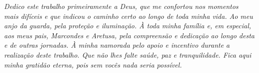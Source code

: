 \begin{titlepage}

\vspace*{\fill}

\hfill
\begin{minipage}{0.5\linewidth}
\begin{flushright}
\large\it
Dedico este trabalho primeiramente a Deus, que me confortou nos momentos mais
difíceis e que indicou o caminho certo ao longo de toda minha vida. Ao meu anjo
da guarda, pela proteção e iluminação. À toda minha família e, em especial, aos
meus pais, Marcondes e Aretusa, pela compreensão e dedicação ao longo desta e de
outras jornadas. À minha namorada pelo apoio e incentivo durante a realização
deste trabalho. Que não lhes falte saúde, paz e tranquilidade. Fica aqui minha
gratidão eterna, pois sem vocês nada seria possível.
\end{flushright}
\end{minipage}

\vspace*{\fill}

\end{titlepage}
